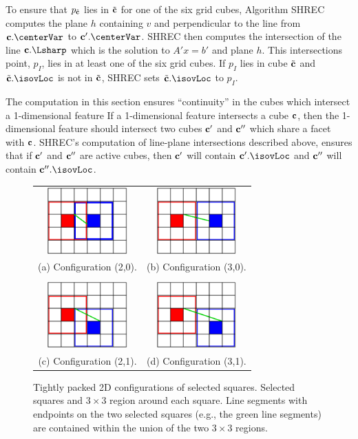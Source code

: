 To ensure that $p_{{\tilde{\mathbf{c}}}}$ lies in ${\tilde{\mathbf{c}}}$ for one of the six grid cubes,
Algorithm SHREC computes the plane $h$ containing $v$
and perpendicular to the line from $\cb.\centerVar$ to $\cb'.\centerVar$.
SHREC then computes the intersection of the line $\cb.\Lsharp$
which is the solution to $A' x = b'$ and plane $h$.
This intersections point, $p_I$, lies in at least one of the six grid cubes.
If $p_I$ lies in cube ${\tilde{\mathbf{c}}}$ and $\tcb.\isovLoc$ is not in ${\tilde{\mathbf{c}}}$,
SHREC sets $\tcb.\isovLoc$ to $p_I$.

The computation in this section ensures ``continuity'' in the cubes
which intersect a 1-dimensional feature
If a 1-dimensional feature intersects a cube $\mathbf{c}$,
then the 1-dimensional feature should intersect two cubes $\mathbf{c}'$ and $\mathbf{c}''$
which share a facet with $\mathbf{c}$.
SHREC's computation of line-plane intersections described above,
ensures that if $\mathbf{c}'$ and $\mathbf{c}''$ are active cubes,
then $\mathbf{c}'$ will contain $\cb'.\isovLoc$ and 
$\mathbf{c}''$ will contain $\cb''.\isovLoc$.


\begin{figure}
\centering
\begin{tabular}{cc}
\includegraphics[width=1.2in]{images/config2D_2_0.eps} \qquad &
\qquad
\includegraphics[width=1.2in]{images/config2D_3_0.eps} \\
(a) Configuration (2,0). & (b) Configuration (3,0). \\
\\
\includegraphics[width=1.2in]{images/config2D_2_1.eps}
\qquad &
\qquad
\includegraphics[width=1.2in]{images/config2D_3_1.eps} \\
(c) Configuration (2,1). & (d) Configuration (3,1).
\end{tabular}
\caption{Tightly packed 2D configurations of selected squares.
Selected squares and $3 \times 3$ region around each square.
Line segments with endpoints on the two selected squares 
(e.g., the green line segments) are contained
within the union of the two $3 \times 3$ regions.}
\label{fig:packed2D}
\end{figure}

